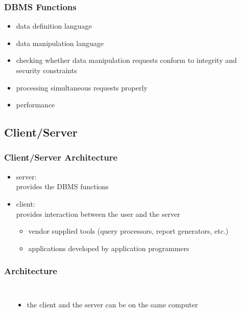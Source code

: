 \documentclass[dvipsnames]{beamer}
\theoremstyle{plain}
\begin{document}
\begin{frame}
  \frametitle{DBMS Functions}

  \begin{itemize}
    \item data definition language

    \pause
    \item data manipulation language

    \pause
    \item checking whether data manipulation requests conform to integrity
      and security constraints

    \pause
    \item processing simultaneous requests properly

    \pause
    \item performance
  \end{itemize}
\end{frame}

\subsection{Client/Server}

\begin{frame}
  \frametitle{Client/Server Architecture}

  \begin{itemize}
    \item \alert{server}:\\
      provides the DBMS functions

    \pause
    \bigskip
    \item \alert{client}:\\
      provides interaction between the user and the server
    \begin{itemize}
      \item vendor supplied tools (query processors, report generators, etc.)
      \item applications developed by application programmers
    \end{itemize}
  \end{itemize}
\end{frame}

\begin{frame}
  \frametitle{Architecture}

  \begin{columns}
    \begin{center}
    \end{center}

    \begin{itemize}
      \item the client and the server can be on the same computer
    \end{itemize}
  \end{columns}
\end{frame}
\end{document}
